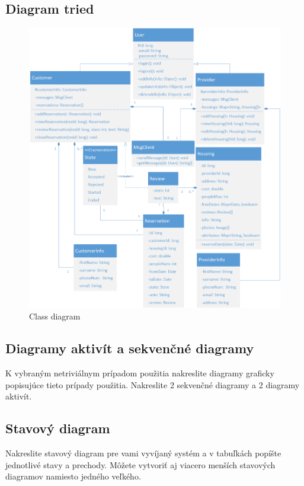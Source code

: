 \newpage

\subsection{Diagram tried}

\begin{figure}[!htbp]
    \centering
    \includegraphics[width=\linewidth]{img/class_diagram.png}
    \caption{Class diagram}
    \label{class_diagram}
\end{figure}

\subsection{Diagramy aktivít a sekvenčné diagramy}
K vybraným netriviálnym prípadom použitia nakreslite
diagramy graficky popisujúce tieto prípady použitia. Nakreslite 2 sekvenčné diagramy a 2
diagramy aktivít.

\subsection{Stavový diagram}
Nakreslite stavový diagram pre vami vyvíjaný systém a v tabuľkách popíšte
jednotlivé stavy a prechody. Môžete vytvoriť aj viacero menších stavových diagramov namiesto
jedného veľkého.

